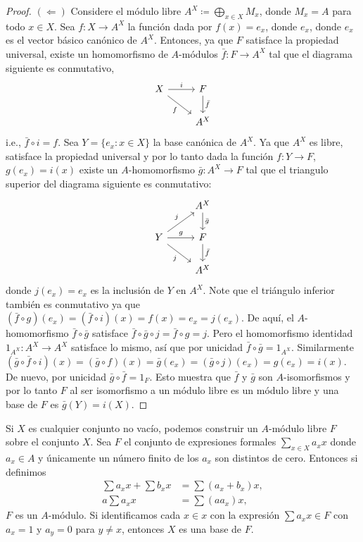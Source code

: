 \begin{proof}
  $(\Leftarrow)$ Considere el módulo libre $A^X \coloneqq \bigoplus_{x \in X} M_x$, donde $M_x = A$ para todo $x \in X$. Sea $f\colon X \to A^X$ la función dada por $f(x) = e_x$, donde $e_x$, donde $e_x$ es el vector básico canónico de $A^X$. Entonces, ya que $F$ satisface la propiedad universal, existe un homomorfismo de $A$-módulos $\bar f \colon F \to A^X$ tal que el diagrama siguiente es conmutativo,
  \[
    \begin{tikzcd}
      X \arrow[r, "i"] \arrow[rd, "f"'] & F \arrow[d, "\bar f"] \\
                                        & A^X                  
      \end{tikzcd}
  \]
i.e., $\bar f \circ i = f$. Sea $Y = \{e_x : x \in X\}$ la base canónica de $A^X$. Ya que $A^X$ es libre, satisface la propiedad universal y por lo tanto dada la función $f \colon Y \to F$, $g(e_x) = i(x)$ existe un $A$\nobreakdash-homomorfismo $\bar g \colon A^X \to F$ tal que el triangulo superior del diagrama siguiente es conmutativo:
\[
  \begin{tikzcd}
                                                    & A^X \arrow[d, "\bar g"] \\
  Y \arrow[ru, "j"] \arrow[rd, "j"'] \arrow[r, "g"] & F \arrow[d, "\bar f"]   \\
                                                    & A^X                    
  \end{tikzcd}
\]
donde $j(e_x) = e_x$ es la inclusión de $Y$ en $A^X$. Note que el triángulo inferior también es conmutativo ya que $(\bar f \circ g)(e_x) = (\bar f \circ i)(x) = f(x) = e_x = j(e_x)$. De aquí, el $A$-homomorfismo $\bar f \circ \bar g$ satisface $\bar f \circ \bar g \circ j = \bar f \circ g = j$. Pero el homomorfismo identidad $1_{A^X} \colon A^X \to A^X$ satisface lo mismo, así que por unicidad $\bar f \circ \bar g = 1_{A^X}$. Similarmente $(\bar g \circ \bar f \circ i)(x) = (\bar g \circ f)(x) = \bar g(e_x) = (\bar g \circ j)(e_x) = g(e_x) = i(x)$. De nuevo, por unicidad $\bar g \circ \bar f = 1_F$. Esto muestra que $\bar f$ y $\bar g$ son $A$-isomorfismos y por lo tanto $F$ al ser isomorfismo a un módulo libre es un módulo libre y una base de $F$ es $\bar g(Y) = i(X)$.
\end{proof}

Si $X$ es cualquier conjunto no vacío, podemos construir un $A$-módulo libre $F$ sobre el conjunto $X$. Sea $F$ el conjunto de expresiones formales $\sum_{x\in X} a_x x$ donde $a_x \in A$ y únicamente un número finito de los $a_x$ son distintos de cero. Entonces si definimos
\begin{align*}
  \sum a_x x +  \sum b_x x &= \sum (a_x + b_x) x, \\
  a \sum a_x x &= \sum (aa_x) x,
\end{align*}
$F$ es un $A$-módulo. Si identificamos cada $x \in x$ con la expresión $\sum a_x x \in F$ con $a_x = 1$ y $a_y = 0$ para $y \neq x$, entonces $X$ es una base de $F$.

